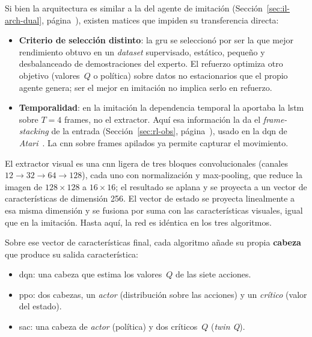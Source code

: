 Si bien la arquitectura es similar a la del agente de imitación (Sección~\ref{sec:il-arch-dual}, página~\pageref{sec:il-arch-dual}),
existen matices que impiden su transferencia directa: 

\begin{itemize}
  \item \textbf{Criterio de selección distinto}: la \gls{gru} se seleccionó por ser la que mejor
  rendimiento obtuvo en un \textit{dataset} supervisado, estático,
  pequeño y desbalanceado de demostraciones del experto. El refuerzo optimiza otro
  objetivo (valores~$Q$ o \gls{política}) sobre datos no estacionarios que el propio
  agente genera; ser el mejor en imitación no implica serlo en refuerzo.
  \item \textbf{Temporalidad}: en la imitación la dependencia
  temporal la aportaba la \gls{lstm} sobre $T=\num{4}$ frames,
  no el extractor. Aquí esa información la da el \textit{\gls{frame-stacking}} de la entrada
  (Sección~\ref{sec:rl-obs}, página~\pageref{sec:rl-obs}), usado en la \gls{dqn} de
  \textit{Atari}~\cite{DBLP:journals/nature/MnihKSRVBGRFOPB15}. La \gls{cnn} sobre frames apilados
  ya permite capturar el movimiento.
\end{itemize}

El extractor visual es una \gls{cnn} ligera de tres bloques
convolucionales (canales $\num{12}\!\to\!\num{32}\!\to\!\num{64}\!\to\!\num{128}$), cada uno con normalización y
\gls{max-pooling}, que reduce la imagen de $\num{128}\times\num{128}$ a $\num{16}\times\num{16}$; el resultado se
aplana y se proyecta a un vector de características de dimensión \num{256}.
El vector de estado se proyecta linealmente a esa misma dimensión y se fusiona por
suma con las características visuales, igual que en la imitación. Hasta
aquí, la red es idéntica en los tres algoritmos.

Sobre ese vector de características final, cada algoritmo añade su propia \textbf{cabeza} que produce su salida característica:
\begin{itemize}
  \item \gls{dqn}: una cabeza que estima los valores~$Q$ de las siete acciones.
  \item \gls{ppo}: dos cabezas, un \emph{actor} (distribución sobre las acciones) y un
  \emph{crítico} (valor del estado).
  \item \gls{sac}: una cabeza de \emph{actor} (\gls{política}) y dos críticos~$Q$ (\textit{twin Q}).
\end{itemize}

